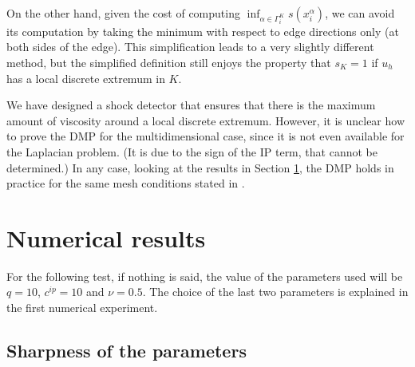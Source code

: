 On the other hand, given the cost of computing $\inf_{\alpha\in\Gamma_i^K} s(x_i^\alpha)$, we can avoid its computation by taking the minimum with respect to edge directions only (at both sides of the edge). This simplification leads to a very slightly different method, but the simplified definition still enjoys the property that $s_K=1$ if $u_h$ has a local discrete extremum in $K$. 

\begin{remark} {
We have designed a shock detector that ensures that there is the maximum amount of viscosity around a local discrete extremum. However, it is unclear how to prove the DMP for the multidimensional case, since it is not even available for the Laplacian problem. (It is due to the sign of the IP term, that cannot be determined.) In any case, looking at the results in Section \ref{s-numex2}, the DMP holds in practice for the same mesh conditions stated in \cite{ourpaper}.
}
\end{remark}




\section{Numerical results}\label{s-numex2}
\label{sec-numres}
For the following test, if nothing is said, the value of the parameters used will be { $q=10$}, $c^{ip} = 10$ and $\nu=0.5$. The choice of the last two parameters is explained in the first numerical experiment.

\subsection{Sharpness of the parameters}

